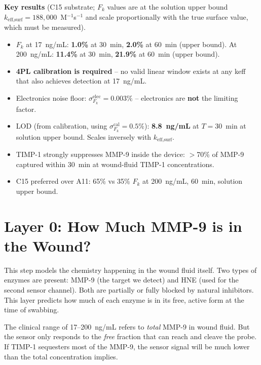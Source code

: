 \documentclass[10pt,a4paper]{article}
\newenvironment{findingbox}{%
  \begin{lrbox}{\tmpbox}\begin{minipage}{0.965\textwidth}\vspace{0.2em}}%
 {\vspace{0.2em}\end{minipage}\end{lrbox}%
  \par\vspace{0.4em}\noindent\colorbox{boxgreen}{\usebox{\tmpbox}}\par\vspace{0.4em}}
\begin{document}
\begin{findingbox}
\textbf{Key results} (C15 substrate; $F_k$ values are at the solution upper bound
$k_\text{eff,surf} = 188{,}000$~M$^{-1}$s$^{-1}$ and scale proportionally with the true
surface value, which must be measured).
\begin{itemize}[noitemsep, topsep=0pt]
\item $F_k$ at 17~ng/mL: \textbf{1.0\%} at 30~min, \textbf{2.0\%} at 60~min (upper bound).
  At 200~ng/mL: \textbf{11.4\%} at 30~min, \textbf{21.9\%} at 60~min (upper bound).
\item \textbf{4PL calibration is required} -- no valid linear window exists at any keff
  that also achieves detection at 17~ng/mL.
\item Electronics noise floor: $\sigma_{F_k}^\text{elec} = 0.003\%$ -- electronics are
  \textbf{not} the limiting factor.
\item LOD (from calibration, using $\sigma_{F_k}^\text{cal} = 0.5\%$): \textbf{8.8~ng/mL}
  at $T = 30$~min at solution upper bound. Scales inversely with $k_\text{eff,surf}$.
\item TIMP-1 strongly suppresses MMP-9 inside the device: $>$70\% of MMP-9 captured within
  30~min at wound-fluid TIMP-1 concentrations.
\item C15 preferred over A11: 65\% vs 35\% $F_k$ at 200~ng/mL, 60~min, solution upper bound.
\end{itemize}
\end{findingbox}

\section{Layer 0: How Much MMP-9 is in the Wound?}


This step models the chemistry happening in the wound fluid itself. Two types of enzymes
are present: MMP-9 (the target we detect) and HNE (used for the second sensor channel).
Both are partially or fully blocked by natural inhibitors. This layer predicts how much of
each enzyme is in its free, active form at the time of swabbing.


The clinical range of 17--200~ng/mL refers to \textit{total} MMP-9 in wound fluid. But the
sensor only responds to the \textit{free} fraction that can reach and cleave the probe. If
TIMP-1 sequesters most of the MMP-9, the sensor signal will be much lower than the total
concentration implies.
\end{document}
